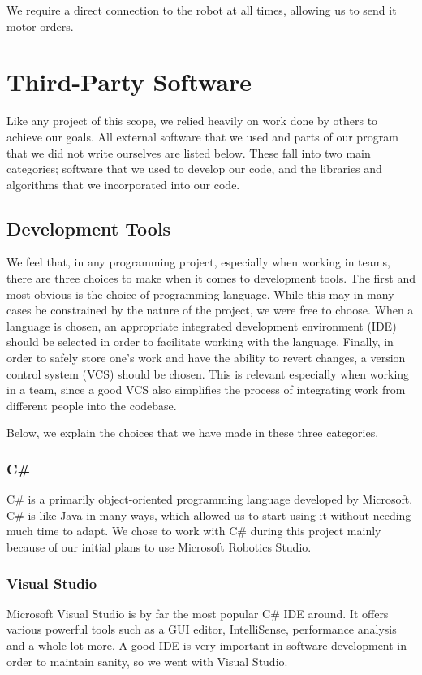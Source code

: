 \documentclass[10pt, abstracton, twocolumn]{scrartcl}
\begin{document}
We require a direct connection to the robot at all times, allowing us to send it motor orders.

\section{Third-Party Software}
Like any project of this scope, we relied heavily on work done by others to achieve our goals. All external software that we used and parts of our program that we did not write ourselves are listed below. These fall into two main categories; software that we used to develop our code, and the libraries and algorithms that we incorporated into our code.

\subsection{Development Tools}
We feel that, in any programming project, especially when working in teams, there are three choices to make when it comes to development tools. The first and most obvious is the choice of programming language. While this may in many cases be constrained by the nature of the project, we were free to choose. When a language is chosen, an appropriate integrated development environment (IDE) should be selected in order to facilitate working with the language. Finally, in order to safely store one's work and have the ability to revert changes, a version control system (VCS) should be chosen. This is relevant especially when working in a team, since a good VCS also simplifies the process of integrating work from different people into the codebase.

Below, we explain the choices that we have made in these three categories.

\subsubsection{C\#}
C\# is a primarily object-oriented programming language developed by Microsoft. C\# is like Java in many ways, which allowed us to start using it without needing much time to adapt. We chose to work with C\# during this project mainly because of our initial plans to use Microsoft Robotics Studio.

\subsubsection{Visual Studio}
Microsoft Visual Studio is by far the most popular C\# IDE around. It offers various powerful tools such as a GUI editor, IntelliSense, performance analysis and a whole lot more. A good IDE is very important in software development in order to maintain sanity, so we went with Visual Studio.
\end{document}
